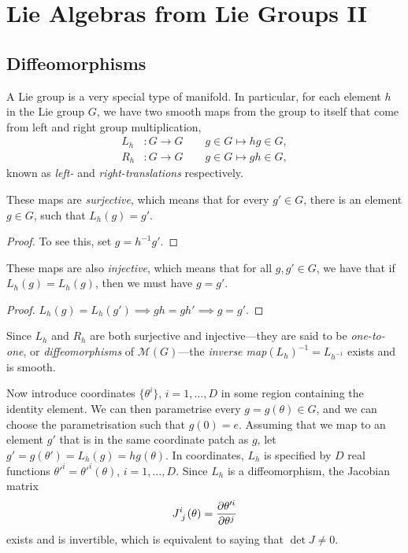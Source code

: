 \chapter{Lie Algebras from Lie Groups II}%
\label{cha:lie_algebras_from_lie_groups_ii}

\section{Diffeomorphisms}%
\label{sec:diffeomorphisms}

A Lie group is a very special type of manifold. In particular, for each element $h$ in the Lie group $G$, we have two smooth maps from the group to itself that come from left and right group multiplication,
\begin{align}
  L_h &\colon G \to G \qquad g \in G \mapsto hg \in G, \\
  R_h &\colon G \to G \qquad g \in G \mapsto gh \in G,
\end{align}
known as \emph{left-} and \emph{right-translations} respectively.

\begin{claim}
  These maps are \emph{surjective}, which means that for every $g' \in G$, there is an element $g \in G$, such that $L_h(g) = g'$. 
\end{claim}
\begin{proof}
  To see this, set $g = h^{-1} g'$.
\end{proof}

\begin{claim}
  These maps are also \emph{injective}, which means that for all $g, g' \in G$, we have that if $L_h(g) = L_h(g)$, then we must have $g = g'$.
\end{claim}
\begin{proof}
  \(
    L_h(g) = L_h(g') \implies gh = gh' \implies g = g'.
    \)
\end{proof}
\begin{definition}[]
  Since $L_h$ and $R_h$ are both surjective and injective---they are said to be \emph{one-to-one}, or \emph{diffeomorphisms} of $\mathcal{M}(G)$---the \emph{inverse map}$(L_h)^{-1} = L_{h^{-1}}$ exists and is smooth.
\end{definition}

\begin{wrapfigure}{L}{0.37\columnwidth}
  \centering
  \def\svgwidth{0.3\columnwidth}
  
  \label{fig:l8f1}
\end{wrapfigure}

Now introduce coordinates $\{ \theta^i \}$, $i = 1, \dots, D$ in some region containing the identity element. We can then parametrise every $g = g(\theta) \in G$, and we can choose the parametrisation such that $g(0) = e$.
Assuming that we map to an element $g'$ that is in the same coordinate patch as $g$, let $g' = g(\theta') = L_h(g) = h g(\theta)$.
In coordinates, $L_h$ is specified by $D$ real functions $\theta'^i = \theta'^i(\theta)$, $i = 1, \dots, D$.
Since $L_h$ is a diffeomorphism, the Jacobian matrix
\begin{equation}
  J \indices{^i_j}(\theta) = \pdv{\theta'^i}{\theta^j}
\end{equation}
exists and is invertible, which is equivalent to saying that $\det J \neq 0$.
